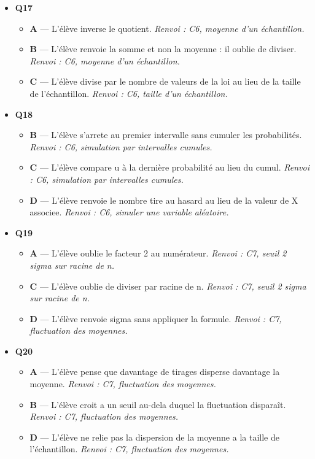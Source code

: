 \begin{itemize}
  \item \textbf{Q17}
  \begin{itemize}
    \item \textbf{A} — L'élève inverse le quotient. \emph{Renvoi : C6, moyenne d'un échantillon.}
    \item \textbf{B} — L'élève renvoie la somme et non la moyenne : il oublie de diviser. \emph{Renvoi : C6, moyenne d'un échantillon.}
    \item \textbf{C} — L'élève divise par le nombre de valeurs de la loi au lieu de la taille de l'échantillon. \emph{Renvoi : C6, taille d'un échantillon.}
  \end{itemize}
  \item \textbf{Q18}
  \begin{itemize}
    \item \textbf{B} — L'élève s'arrete au premier intervalle sans cumuler les probabilités. \emph{Renvoi : C6, simulation par intervalles cumules.}
    \item \textbf{C} — L'élève compare u à la dernière probabilité au lieu du cumul. \emph{Renvoi : C6, simulation par intervalles cumules.}
    \item \textbf{D} — L'élève renvoie le nombre tire au hasard au lieu de la valeur de X associee. \emph{Renvoi : C6, simuler une variable aléatoire.}
  \end{itemize}
  \item \textbf{Q19}
  \begin{itemize}
    \item \textbf{A} — L'élève oublie le facteur 2 au numérateur. \emph{Renvoi : C7, seuil 2 sigma sur racine de n.}
    \item \textbf{C} — L'élève oublie de diviser par racine de n. \emph{Renvoi : C7, seuil 2 sigma sur racine de n.}
    \item \textbf{D} — L'élève renvoie sigma sans appliquer la formule. \emph{Renvoi : C7, fluctuation des moyennes.}
  \end{itemize}
  \item \textbf{Q20}
  \begin{itemize}
    \item \textbf{A} — L'élève pense que davantage de tirages disperse davantage la moyenne. \emph{Renvoi : C7, fluctuation des moyennes.}
    \item \textbf{B} — L'élève croit a un seuil au-dela duquel la fluctuation disparaît. \emph{Renvoi : C7, fluctuation des moyennes.}
    \item \textbf{D} — L'élève ne relie pas la dispersion de la moyenne a la taille de l'échantillon. \emph{Renvoi : C7, fluctuation des moyennes.}

\end{itemize}
\end{itemize}
